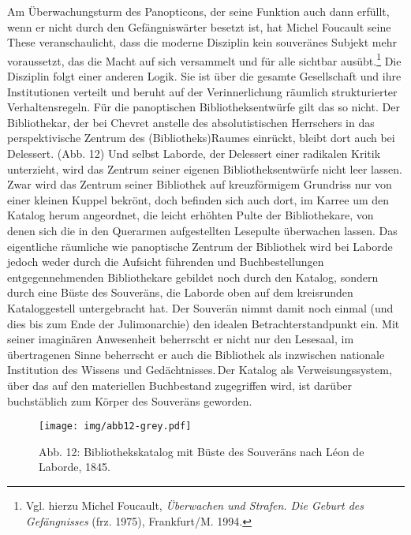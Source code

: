 Am Überwachungsturm des Panopticons, der seine Funktion auch dann
erfüllt, wenn er nicht durch den Gefängniswärter besetzt ist, hat Michel
Foucault seine These veranschaulicht, dass die moderne Disziplin kein
souveränes Subjekt mehr voraussetzt, das die Macht auf sich versammelt
und für alle sichtbar ausübt.\footnote{Vgl. hierzu Michel Foucault,
  \emph{Überwachen und Strafen. Die Geburt des Gefängnisses} (frz.
  1975), Frankfurt/M. 1994.} Die Disziplin folgt einer anderen Logik.
Sie ist über die gesamte Gesellschaft und ihre Institutionen verteilt
und beruht auf der Verinnerlichung räumlich strukturierter
Verhaltensregeln. Für die panoptischen Bibliotheksentwürfe gilt das so
nicht. Der Bibliothekar, der bei Chevret anstelle des absolutistischen
Herrschers in das perspektivische Zentrum des (Bibliotheks)Raumes
einrückt, bleibt dort auch bei Delessert. (Abb. 12) Und selbst Laborde,
der Delessert einer radikalen Kritik unterzieht, wird das Zentrum seiner
eigenen Bibliotheksentwürfe nicht leer lassen. Zwar wird das Zentrum
seiner Bibliothek auf kreuzförmigem Grundriss nur von einer kleinen
Kuppel bekrönt, doch befinden sich auch dort, im Karree um den Katalog
herum angeordnet, die leicht erhöhten Pulte der Bibliothekare, von denen
sich die in den Querarmen aufgestellten Lesepulte überwachen lassen. Das
eigentliche räumliche wie panoptische Zentrum der Bibliothek wird bei
Laborde jedoch weder durch die Aufsicht führenden und Buchbestellungen
entgegennehmenden Bibliothekare gebildet noch durch den Katalog, sondern
durch eine Büste des Souveräns, die Laborde oben auf dem kreisrunden
Kataloggestell untergebracht hat. Der Souverän nimmt damit noch einmal
(und dies bis zum Ende der Julimonarchie) den idealen
Betrachterstandpunkt ein. Mit seiner imaginären Anwesenheit beherrscht
er nicht nur den Lesesaal, im übertragenen Sinne beherrscht er auch die
Bibliothek als inzwischen nationale Institution des Wissens und
Gedächtnisses.\,Der Katalog als Verweisungssystem, über das auf den
materiellen Buchbestand zugegriffen wird, ist darüber buchstäblich zum
Körper des Souveräns geworden.

\begin{figure}[htbp]
\centering
\texttt{[image: img/abb12-grey.pdf]}
\caption*{Abb. 12: Bibliothekskatalog mit Büste des Souveräns nach Léon
de Laborde, 1845.}
\end{figure}

